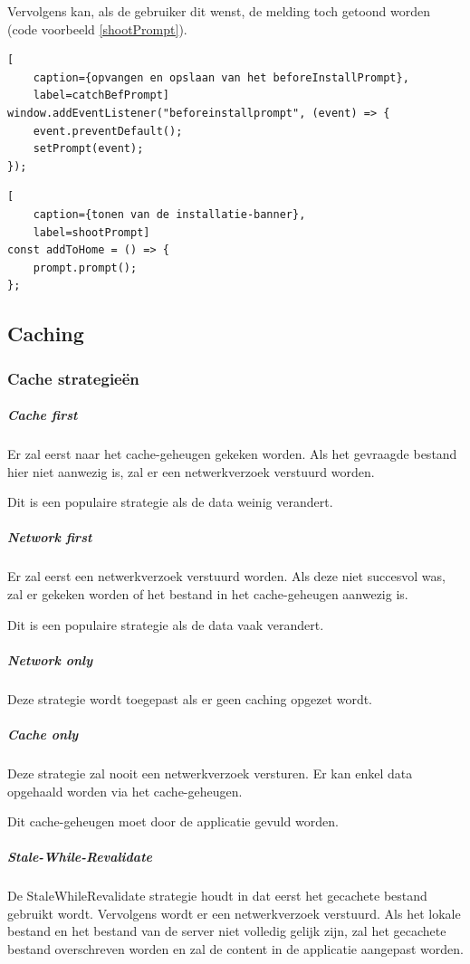 		\newpage
		Vervolgens kan, als de gebruiker dit wenst, de melding toch getoond worden (code voorbeeld \ref{shootPrompt}). 
	

\begin{lstlisting}[
	caption={opvangen en opslaan van het beforeInstallPrompt},
	label=catchBefPrompt]
window.addEventListener("beforeinstallprompt", (event) => {
	event.preventDefault();
	setPrompt(event);
}); 
\end{lstlisting}

	
		
\begin{lstlisting}[
	caption={tonen van de installatie-banner},
	label=shootPrompt]
const addToHome = () => {
	prompt.prompt();
};
\end{lstlisting}
	\subsection{Caching}
	
		\subsubsection{Cache strategieën}
		
			\subparagraph{Cache first}
				Er zal eerst naar het cache-geheugen gekeken worden. Als het gevraagde bestand hier niet aanwezig is, zal er een netwerkverzoek verstuurd worden.
				
				Dit is een populaire strategie als de data weinig verandert. 
			\subparagraph{Network first}
				Er zal eerst een netwerkverzoek verstuurd worden. Als deze niet succesvol was, zal er gekeken worden of het bestand in het cache-geheugen aanwezig is. 
				
				Dit is een populaire strategie als de data vaak verandert.
			\subparagraph{Network only}
				Deze strategie wordt toegepast als er geen caching opgezet wordt. 
			\subparagraph{Cache only}
				Deze strategie zal nooit een netwerkverzoek versturen. Er kan enkel data opgehaald worden via het cache-geheugen.
				
				Dit cache-geheugen moet door de applicatie gevuld worden.
			\subparagraph{Stale-While-Revalidate}
				De StaleWhileRevalidate strategie houdt in dat eerst het \mbox{gecachete} bestand gebruikt wordt. Vervolgens wordt er een netwerkverzoek verstuurd. Als het \mbox{lokale} bestand en het bestand van de server niet volledig gelijk zijn, zal het gecachete bestand overschreven worden en zal de content  in de applicatie aangepast worden.
				
